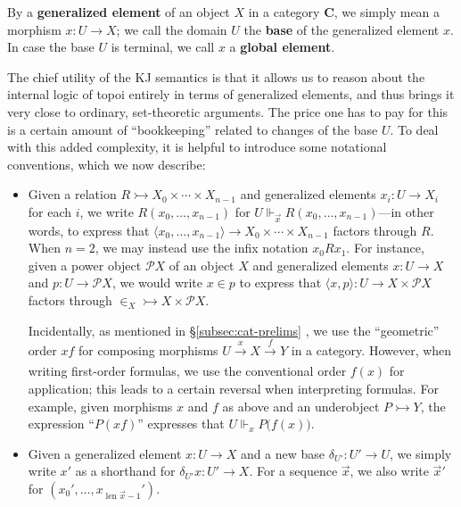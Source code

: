 \documentclass{amsart}
\newcommand\bC{\mathbf{C}}
\newcommand\br[1]{\langle{}#1\rangle{}}
\newcommand\defword[1]{{\boldmath \textbf{#1}}}
\newcommand\len{\operatorname{len}}
\newcommand\pbig[1]{\big({#1}\big)}
\newcommand\pow{\mathcal{P}}
\newcommand\tox[2][]{\xrightarrow[#1]{#2}}
\newcommand\tto{\rightarrowtail}
\newcommand\unin{{\in}}
\newcommand\vek[1]{{\vec{#1}}}
\newcommand\vx{\vek{x}}
\newcommand\prerefpost[3]{%
  \texorpdfstring%
    {\hyperref[#2]{#1\ref*{#2}#3}}%
    {#1\ref*{#2}#3}%
}
\newcommand\sref[1]{\prerefpost{\S}{#1}{}}
\theoremstyle{definition}
\theoremstyle{remark}
\theoremstyle{plainwithref}
\begin{document}
\begin{rmk} \label{rmk:kj-bookkeeping}
  By a \defword{generalized element} of an object \( X \) in a category \( \bC \), we simply mean a morphism \( x \colon U \to X \); we call the domain \( U \) the \defword{base} of the generalized element \( x \).
In case the base \( U \) is terminal, we call \( x \) a \defword{global element}.

  The chief utility of the KJ semantics is that it allows us to reason about the internal logic of topoi entirely in terms of generalized elements, and thus brings it very close to ordinary, set-theoretic arguments.
  The price one has to pay for this is a certain amount of ``bookkeeping'' related to changes of the base \( U \).
  To deal with this added complexity, it is helpful to introduce some notational conventions, which we now describe:
  \begin{itemize}
  \item Given a relation \( R \tto X_0 \times \cdots \times X_{n-1} \) and generalized elements \( x_i \colon U \to X_i \) for each \( i \), we write \( R(x_0,\ldots,x_{n-1}) \) for \( U \Vdash_{\vx} R(x_0,\ldots,x_{n - 1}) \)---in other words, to express that \( \br{x_0,\ldots,x_{n-1}} \to X_0 \times \cdots \times X_{n-1} \) factors through \( R \).
    When \( n = 2 \), we may instead use the infix notation \( x_0 R x_1 \).
    For instance, given a power object \( \pow X \) of an object \( X \) and generalized elements \( x \colon U \to X \) and \( p \colon U \to \pow X \), we would write \( x \in p \) to express that \( \br{x,p} \colon U \to X \times \pow X \) factors through \( \unin_X \tto X \times \pow X \).

    Incidentally, as mentioned in \sref{subsec:cat-prelims}, we use the ``geometric'' order \( x f \) for composing morphisms \( U \tox{x} X \tox{f} Y \) in a category.
    However, when writing first-order formulas, we use the conventional order \( f(x) \) for application; this leads to a certain reversal when interpreting formulas.
    For example, given morphisms \( x \) and \( f \) as above and an underobject \( P \tto Y \), the expression ``\( P(x f) \)'' expresses that \( U \Vdash_x P\pbig{f(x)} \).
  \item Given a generalized element \( x \colon U \to X \) and a new base \( \delta_{U'} \colon U' \to U \), we simply write \( x' \) as a shorthand for \( \delta_{U'} x \colon U' \to X \).
    For a sequence \( \vx \), we also write \( \vx' \) for \( (x_0',\ldots,x_{\len \vx - 1}') \).


\end{itemize}
\end{rmk}
\end{document}
